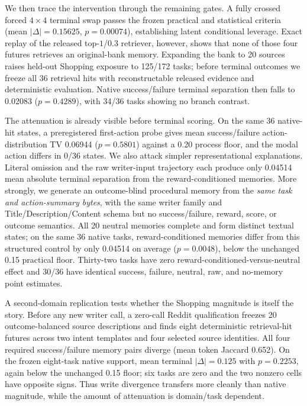 We then trace the intervention through the remaining gates. A fully crossed forced $4\times4$ terminal swap passes the frozen practical and statistical criteria (mean $|\Delta|=0.15625$, $p=0.00074$), establishing latent conditional leverage. Exact replay of the released top-$1$/0.3 retriever, however, shows that none of those four futures retrieves an original-bank memory. Expanding the bank to 20 sources raises held-out Shopping exposure to 125/172 tasks; before terminal outcomes we freeze all 36 retrieval hits with reconstructable released evidence and deterministic evaluation. Native success/failure terminal separation then falls to 0.02083 ($p=0.4289$), with 34/36 tasks showing no branch contrast.

The attenuation is already visible before terminal scoring. On the same 36 native-hit states, a preregistered first-action probe gives mean success/failure action-distribution TV 0.06944 ($p=0.5801$) against a 0.20 process floor, and the modal action differs in 0/36 states. We also attack simpler representational explanations. Literal omission and the raw writer-input trajectory each produce only 0.04514 mean absolute terminal separation from the reward-conditioned memories. More strongly, we generate an outcome-blind procedural memory from the \emph{same task and action-summary bytes}, with the same writer family and Title/Description/Content schema but no success/failure, reward, score, or outcome semantics. All 20 neutral memories complete and form distinct textual states; on the same 36 native tasks, reward-conditioned memories differ from this structured control by only 0.04514 on average ($p=0.0048$), below the unchanged 0.15 practical floor. Thirty-two tasks have zero reward-conditioned-versus-neutral effect and 30/36 have identical success, failure, neutral, raw, and no-memory point estimates.

A second-domain replication tests whether the Shopping magnitude is itself the story. Before any new writer call, a zero-call Reddit qualification freezes 20 outcome-balanced source descriptions and finds eight deterministic retrieval-hit futures across two intent templates and four selected source identities. All four required success/failure memory pairs diverge (mean token Jaccard 0.652). On the frozen eight-task native support, mean terminal $|\Delta|=0.125$ with $p=0.2253$, again below the unchanged 0.15 floor; six tasks are zero and the two nonzero cells have opposite signs. Thus write divergence transfers more cleanly than native magnitude, while the amount of attenuation is domain/task dependent.

